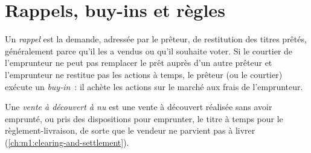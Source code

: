 \section{Rappels, buy-ins et règles}

\begin{definition}\label{def:m1:stock-loan-and-short-selling:recall}
Un \emph{rappel} est la demande, adressée par le prêteur, de restitution des titres
prêtés, généralement parce qu'il les a vendus ou qu'il souhaite voter. Si le
courtier de l'emprunteur ne peut pas remplacer le prêt auprès d'un autre prêteur et
l'emprunteur ne restitue pas les actions à temps, le prêteur (ou le courtier)
exécute un \emph{buy-in}~: il achète les actions sur le marché aux
frais de l'emprunteur.
\end{definition}

\begin{definition}\label{def:m1:stock-loan-and-short-selling:naked}
Une \emph{vente à découvert à nu} est une vente à découvert réalisée
sans avoir emprunté, ou pris des dispositions pour emprunter, le titre à temps pour
le règlement-livraison, de sorte que le vendeur ne parvient pas à livrer
(\cref{ch:m1:clearing-and-settlement}).
\end{definition}

